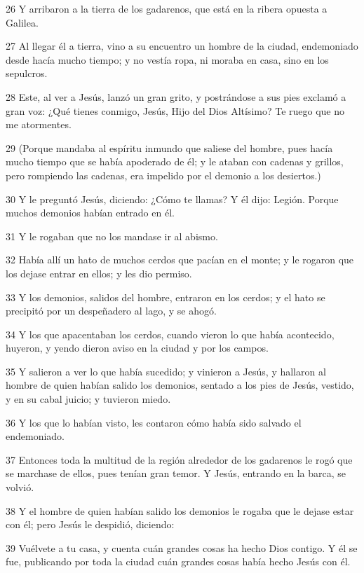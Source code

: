 \par 26 Y arribaron a la tierra de los gadarenos, que está en la ribera opuesta a Galilea.
\par 27 Al llegar él a tierra, vino a su encuentro un hombre de la ciudad, endemoniado desde hacía mucho tiempo; y no vestía ropa, ni moraba en casa, sino en los sepulcros.
\par 28 Este, al ver a Jesús, lanzó un gran grito, y postrándose a sus pies exclamó a gran voz: ¿Qué tienes conmigo, Jesús, Hijo del Dios Altísimo? Te ruego que no me atormentes.
\par 29 (Porque mandaba al espíritu inmundo que saliese del hombre, pues hacía mucho tiempo que se había apoderado de él; y le ataban con cadenas y grillos, pero rompiendo las cadenas, era impelido por el demonio a los desiertos.)
\par 30 Y le preguntó Jesús, diciendo: ¿Cómo te llamas? Y él dijo: Legión. Porque muchos demonios habían entrado en él.
\par 31 Y le rogaban que no los mandase ir al abismo.
\par 32 Había allí un hato de muchos cerdos que pacían en el monte; y le rogaron que los dejase entrar en ellos; y les dio permiso.
\par 33 Y los demonios, salidos del hombre, entraron en los cerdos; y el hato se precipitó por un despeñadero al lago, y se ahogó.
\par 34 Y los que apacentaban los cerdos, cuando vieron lo que había acontecido, huyeron, y yendo dieron aviso en la ciudad y por los campos.
\par 35 Y salieron a ver lo que había sucedido; y vinieron a Jesús, y hallaron al hombre de quien habían salido los demonios, sentado a los pies de Jesús, vestido, y en su cabal juicio; y tuvieron miedo.
\par 36 Y los que lo habían visto, les contaron cómo había sido salvado el endemoniado.
\par 37 Entonces toda la multitud de la región alrededor de los gadarenos le rogó que se marchase de ellos, pues tenían gran temor. Y Jesús, entrando en la barca, se volvió.
\par 38 Y el hombre de quien habían salido los demonios le rogaba que le dejase estar con él; pero Jesús le despidió, diciendo:
\par 39 Vuélvete a tu casa, y cuenta cuán grandes cosas ha hecho Dios contigo. Y él se fue, publicando por toda la ciudad cuán grandes cosas había hecho Jesús con él.

